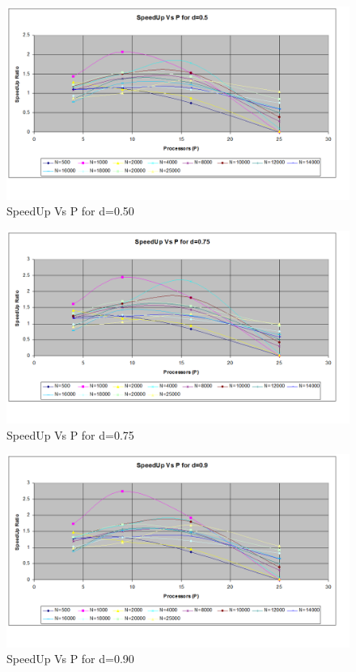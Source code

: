 \documentclass[twoside,11pt]{article}\usepackage{amsmath,amsfonts,amsthm,fullpage}
\begin{document}
\begin{figure}[!htbp]
\centering
\includegraphics[scale=.46]{charts/speedup_p_n_d_50} 
\caption{SpeedUp Vs P for d=0.50}
\label{SpeedUp Vs P for d=0.50}
\end{figure}

\begin{figure}[!htbp]
\centering
\includegraphics[scale=.46]{charts/speedup_p_n_d_75} 
\caption{SpeedUp Vs P for d=0.75}
\label{SpeedUp Vs P for d=0.75}
\end{figure}

\begin{figure}[!htbp]
\centering
\includegraphics[scale=.46]{charts/speedup_p_n_d_90} 
\caption{SpeedUp Vs P for d=0.90}
\label{SpeedUp Vs P for d=0.90}
\end{figure}
\end{document}
